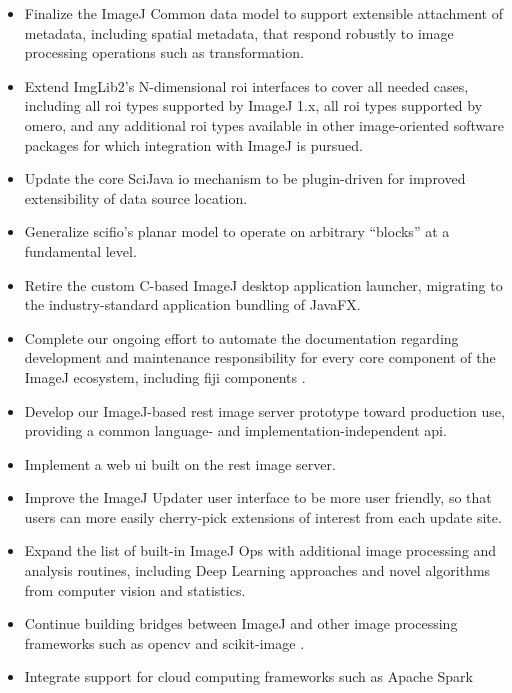 \documentclass{bmcart}
\begin{document}
\begin{itemize}
  \item Finalize the ImageJ Common data model to support extensible attachment
    of metadata, including spatial metadata, that respond robustly to image
    processing operations such as transformation.
  \item Extend ImgLib2's N-dimensional \acrshort{roi} interfaces to cover all
    needed cases, including all \acrshort{roi} types supported by ImageJ 1.x,
    all \acrshort{roi} types supported by \acrshort{omero}, and any additional
    \acrshort{roi} types available in other image-oriented software packages
    for which integration with ImageJ is pursued.
  \item Update the core SciJava \acrshort{io} mechanism to be plugin-driven
    for improved extensibility of data source location.
  \item Generalize \acrshort{scifio}'s planar model to operate on arbitrary
    ``blocks'' at a fundamental level.
  \item Retire the custom C-based ImageJ desktop application launcher,
    migrating to the industry-standard application bundling of JavaFX.
  \item Complete our ongoing effort to automate the documentation regarding
    development and maintenance responsibility for every core component of the
    ImageJ ecosystem, including \acrshort{fiji} components \cite{imagej_team}.
  \item Develop our ImageJ-based \acrshort{rest} image server prototype toward
    production use, providing a common language- and implementation-independent
    \acrshort{api}.
  \item Implement a web \acrshort{ui} built on the \acrshort{rest} image
    server.
  \item Improve the ImageJ Updater user interface to be more user friendly, so
    that users can more easily cherry-pick extensions of interest from each
    update site.
  \item Expand the list of built-in ImageJ Ops with additional image processing
    and analysis routines, including Deep Learning approaches
    \cite{deep_learning} and novel algorithms from computer vision and
    statistics.
  \item Continue building bridges between ImageJ and other image processing
    frameworks such as \acrshort{opencv} \cite{opencv} and scikit-image
    \cite{scikit_image}.
  \item Integrate support for cloud computing frameworks such as Apache Spark

\end{itemize}
\end{document}
